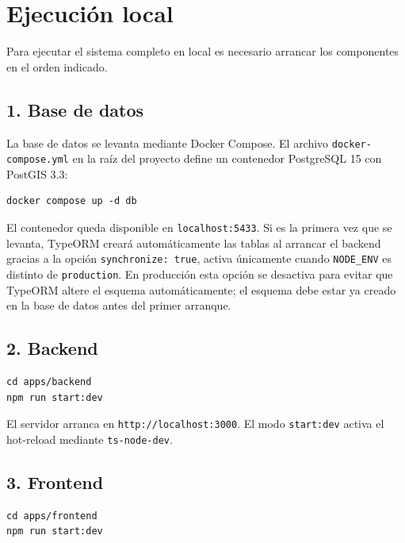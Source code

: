 \section{Ejecución local}

Para ejecutar el sistema completo en local es necesario arrancar los componentes en el orden indicado.

\subsection{1. Base de datos}

La base de datos se levanta mediante Docker Compose. El archivo \texttt{docker-compose.yml} en la raíz del proyecto define un contenedor PostgreSQL 15 con PostGIS 3.3:

\begin{lstlisting}
docker compose up -d db
\end{lstlisting}

El contenedor queda disponible en \texttt{localhost:5433}. Si es la primera vez que se levanta, TypeORM creará automáticamente las tablas al arrancar el backend gracias a la opción \texttt{synchronize: true}, activa únicamente cuando \texttt{NODE\_ENV} es distinto de \texttt{production}. En producción esta opción se desactiva para evitar que TypeORM altere el esquema automáticamente; el esquema debe estar ya creado en la base de datos antes del primer arranque.

\subsection{2. Backend}

\begin{lstlisting}
cd apps/backend
npm run start:dev
\end{lstlisting}

El servidor arranca en \texttt{http://localhost:3000}. El modo \texttt{start:dev} activa el hot-reload mediante \texttt{ts-node-dev}.

\subsection{3. Frontend}

\begin{lstlisting}
cd apps/frontend
npm run start:dev
\end{lstlisting}

